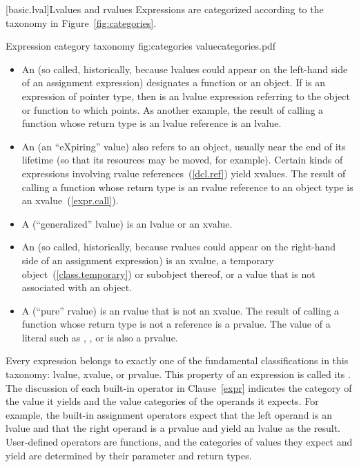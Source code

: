 [basic.lval]{Lvalues and rvalues}
\pnum
Expressions are categorized according to the taxonomy in Figure~\ref{fig:categories}.

\begin{importgraphic}
{Expression category taxonomy}
{fig:categories}
{valuecategories.pdf}
\end{importgraphic}

\begin{itemize}
\item An  (so called, historically, because lvalues could appear
on the left-hand side of an assignment expression) designates a function or an object.
\enterexample If  is an expression of pointer type, then  is
an lvalue expression referring to the object or function to which  points.
As another example, the result of calling a function whose return type is an
lvalue reference is an lvalue. \exitexample

\item An  (an ``eXpiring'' value) also refers to an object, usually near
the end of its lifetime (so that its resources may be moved, for example).
Certain kinds of expressions involving rvalue references~(\ref{dcl.ref}) yield xvalues.
\enterexample The result of calling a function whose return type is an rvalue reference
to an object type is an xvalue~(\ref{expr.call}). \exitexample

\item A  (``generalized'' lvalue) is an lvalue or an xvalue.

\item An  (so called, historically, because rvalues could appear
on the right-hand side of an assignment expression) is an xvalue, a temporary
object~(\ref{class.temporary}) or subobject thereof, or a value that is not
associated with an object.

\item A  (``pure'' rvalue) is an rvalue that is not an xvalue.
\enterexample The result of calling a function whose return type is not a reference
is a prvalue. The value of a literal such as , , or 
is also a prvalue. \exitexample
\end{itemize}

Every expression belongs to exactly one of the fundamental classifications in this
taxonomy: lvalue, xvalue, or prvalue. This property of an expression is called
its . \enternote The discussion of each built-in operator in
Clause~\ref{expr} indicates the category of the value it yields and the value categories
of the operands it expects. For example, the built-in assignment operators expect that
the left operand is an lvalue and that the right operand is a prvalue and yield an
lvalue as the result. User-defined operators are functions, and the categories of
values they expect and yield are determined by their parameter and return types. \exitnote

